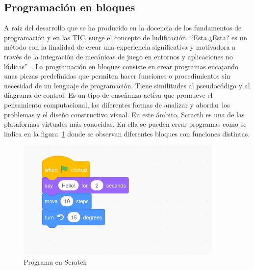 \documentclass[a4paper, 12pt]{book}
\begin{document}
\subsection{Programación en bloques}
A raíz del desarrollo que se ha producido en la docencia de los fundamentos de programación y en las TIC, surge el concepto de ludificación. ``Esta {\color{red} ¿Esta?} es un método con la finalidad de crear una experiencia  significativa y motivadora a través de la integración de mecánicas de juego en entornos y aplicaciones no lúdicas''~\cite{lopez2017pensamiento}. La programación en bloques consiste en crear programas encajando unas piezas  predefinidas que permiten hacer funciones o procedimientos sin necesidad de un lenguaje de programación. Tiene similitudes al pseudocódigo y al diagrama de control. Es un tipo de enseñanza activa que promueve el pensamiento computacional, las diferentes formas de analizar y abordar los problemas y el diseño constructivo visual.
En este ámbito, Scracth es una de las plataformas virtuales más conocidas. En ella se pueden crear programas como se indica en la figura~\ref{figura:scratch} donde se observan diferentes bloques con funciones distintas.
\begin{figure}[h]
        \centering
        \includegraphics[scale=0.55]{img/scratch.png}
        \caption{Programa en Scratch}
        \label{figura:scratch}
\end{figure}
\end{document}
